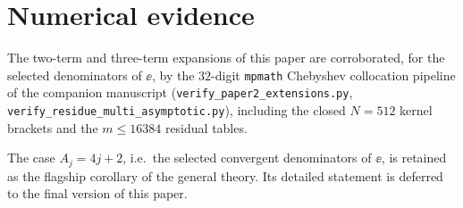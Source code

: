 











\section{Numerical evidence}\label{sec:num}
\begin{remark}\label{rem:num-2A}
The two-term and three-term expansions of this paper are corroborated, for the
selected denominators of $\ee$, by the $32$-digit \texttt{mpmath} Chebyshev
collocation pipeline of the companion manuscript
(\texttt{verify\_paper2\_extensions.py},
\texttt{verify\_residue\_multi\_asymptotic.py}), including the closed
$N=512$ kernel brackets and the $m\le16384$ residual tables.
\end{remark}




\begin{remark}\label{rem:e-flagship}
The case $A_j=4j+2$, i.e.\ the selected convergent denominators of $\ee$, is
retained as the flagship corollary of the general theory. Its detailed
statement is deferred to the final version of this paper.
\end{remark}




